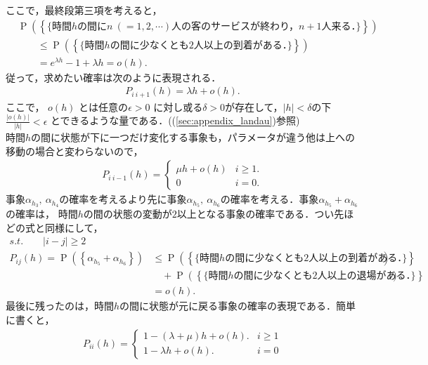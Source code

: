 \documentclass[a4j,papersize,disablejfam,slide,14pt]{jsarticle}
\def\exp#1{e^{#1}} %
\def\prob#1{\operatorname{P} \left(\left\{ #1 \right\}\right)} %
\begin{document}
    ここで，最終段第三項を考えると，
    \begin{align}
    		&\prob{\mbox{\{ 時間$h$の間に$n\ (=1,2,\cdots)$人の客のサービスが終わり，$n+1$人来る．\}}} \\
            &\qquad\leq \prob{\mbox{\{ 時間$h$の間に少なくとも$2$人以上の到着がある．\}}} \\
        	&\qquad= \exp{\lambda h} - 1 + \lambda h = o(h). 
    \end{align}
    従って，求めたい確率は次のように表現される．
    \begin{align}
        P_{i\ i+1}(h) = \lambda h + o(h).
    \end{align}
    ここで， $o(h)$ とは任意の$\epsilon > 0$ に対し或る$\delta >0$が存在して，$|h| < \delta$の下$\frac{|o(h)|}{|h|} < \epsilon$ とできるような量である．((\ref{sec:appendix_landau})参照) \\
    時間$h$の間に状態が下に一つだけ変化する事象も，パラメータが違う他は上への移動の場合と変わらないので，
    \begin{align}
        P_{i\ i-1}(h) = 
        \begin{cases}
        	\mu h + o(h) & \text{$i \geq 1$}. \\
            0 & \text{$i = 0$}.
        \end{cases}
    \end{align}
    事象$\alpha_h_3,\ \alpha_h_4$の確率を考えるより先に事象$\alpha_h_5,\ \alpha_h_6$の確率を考える．事象$\alpha_h_5 + \alpha_h_6$の確率は，
    時間$h$の間の状態の変動が$2$以上となる事象の確率である．つい先ほどの式と同様にして，
    \begin{align}
    	s.t.\qquad |i - j| \geq 2 \\
    	P_{ij}(h) = \prob{\alpha_h_5 + \alpha_h_6}
    	&\leq \prob{\mbox{\{ 時間$h$の間に少なくとも$2$人以上の到着がある．\}}} \\
        &\quad+ \prob{\mbox{\{ 時間$h$の間に少なくとも$2$人以上の退場がある．\}}} \\
        &= o(h). &\label{eq:trans_mt2}
    \end{align}
    最後に残ったのは，時間$h$の間に状態が元に戻る事象の確率の表現である．簡単に書くと，
    \begin{align}
    	P_{ii}(h) =
        \begin{cases} 
        	1 - (\lambda + \mu) h + o(h). & \text{$i \geq 1$} \\
            1 - \lambda h + o(h). & \text{$i = 0$}
        \end{cases}
    \end{align}
\end{document}
